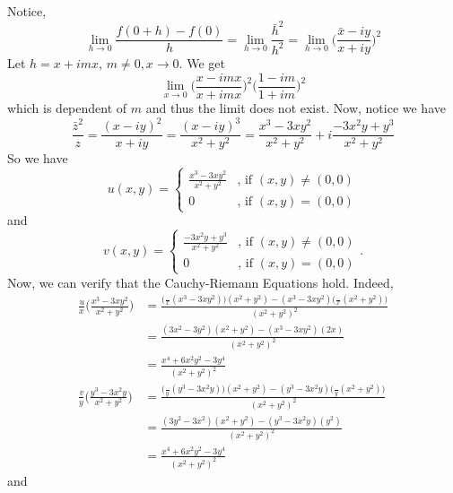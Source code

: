 \documentclass[11pt]{article}
\newcommand*{\pd}[3][]{\ensuremath{\frac{^{#1} #2}{ #3^{#1}}}}
\begin{document}
Notice,
\begin{equation*}
	\lim_{h \to 0} \frac{f(0+h) - f(0)}{h}
	= \lim_{h \to 0} \frac{\bar h^2}{h^2}
	= \lim_{h \to 0} \bigg(\frac{\bar x-iy}{x+iy}\bigg)^2
\end{equation*}
Let $h = x + imx$, $m \neq 0, x \to 0$. We get
\begin{equation*}
	\lim_{x \to 0} \bigg( \frac{x - imx}{x + imx}\bigg)^2
	\bigg( \frac{1 - im}{1 + im}\bigg)^2
\end{equation*}
which is dependent of $m$ and thus the limit does not exist. Now, notice we have
\begin{equation*}
	\frac{\bar z^2}{z} = \frac{(x - iy)^2}{x+iy} = \frac{(x-iy)^3}{x^2+y^2}
	= \frac{x^3 - 3xy^2}{x^2+y^2} + i \frac{-3x^2y + y^3}{x^2+y^2}
\end{equation*}
So we have
\begin{equation*}
	u(x,y) =
	\begin{cases}
		\frac{x^3 - 3xy^2}{x^2+y^2} & \text{, if } (x,y) \neq (0,0)\\
		0 & \text{, if } (x,y) = (0,0)
	\end{cases}
\end{equation*}
and
\begin{equation*}
	v(x,y) =
	\begin{cases}
		\frac{-3x^2y + y^3}{x^2+y^2} & \text{, if } (x,y) \neq (0,0)\\
		0 & \text{, if } (x,y) = (0,0)
	\end{cases}.
\end{equation*}
Now, we can verify that the Cauchy-Riemann Equations hold. Indeed,
\begin{align*}
	\pd{u}{x}\bigg(\frac{x^3 - 3xy^2}{x^2+y^2}\bigg)
	&= \frac{\big(\pd{}{x}(x^3 - 3xy^2)\big)(x^2 + y^2) - (x^3 -
3xy^2)\big(\pd{}{x}(x^2+y^2)\big)}{(x^2 + y^2)^2}\\
&= \frac{(3x^2 - 3y^2)(x^2 + y^2) - (x^3 - 3xy^2)(2x)}{(x^2 + y^2)^2}\\
&= \frac{x^4 + 6x^2y^2 - 3y^4}{(x^2 + y^2)^2}\\
\pd{v}{y}\bigg(\frac{y^3 - 3x^2y}{x^2+y^2} \bigg)
&= \frac{\big(\pd{}{y}(y^3 - 3x^2y)\big)(x^2 + y^2) - (y^3 -
3x^2y)\big(\pd{}{y}(x^2+y^2)\big)}{(x^2 + y^2)^2}\\
&= \frac{(3y^2 - 3x^2)(x^2 + y^2) - (y^3 - 3x^2y)(y^2)}{(x^2 + y^2)^2}\\
&= \frac{x^4 + 6x^2y^2 - 3y^4}{(x^2 + y^2)^2}
\end{align*}
and
\end{document}
